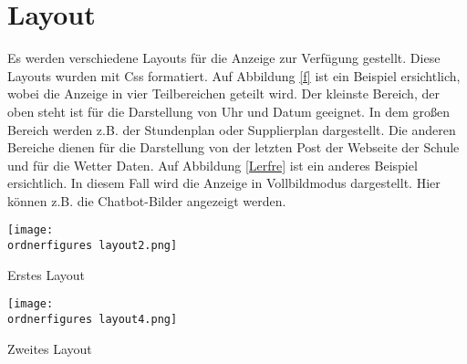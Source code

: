 \section{Layout}
Es werden verschiedene Layouts f\"ur die Anzeige zur Verf\"ugung gestellt. Diese Layouts wurden mit Css formatiert. Auf Abbildung \ref{f} ist ein Beispiel ersichtlich, wobei die Anzeige in vier Teilbereichen geteilt wird. Der kleinste Bereich, der oben steht ist f\"ur die Darstellung von Uhr und Datum geeignet. In dem gro\ss{}en Bereich werden z.B. der Stundenplan oder Supplierplan dargestellt. Die anderen Bereiche dienen f\"ur die Darstellung von der letzten Post der Webseite der Schule und f\"ur die Wetter Daten.
Auf Abbildung \ref{Lerfre} ist ein anderes Beispiel ersichtlich. In diesem Fall wird die Anzeige in Vollbildmodus dargestellt. Hier k\"onnen z.B. die Chatbot-Bilder angezeigt werden.
\begin{center}
	\captionsetup{type=figure}
	\texttt{[image: \\ordnerfigures layout2.png]}
	\caption{Erstes Layout}
	\label{f} 
\end{center}
\begin{center}
	\captionsetup{type=figure}
	\texttt{[image: \\ordnerfigures layout4.png]}
	\caption{Zweites Layout}
	\label{Lerfre} 
\end{center}
